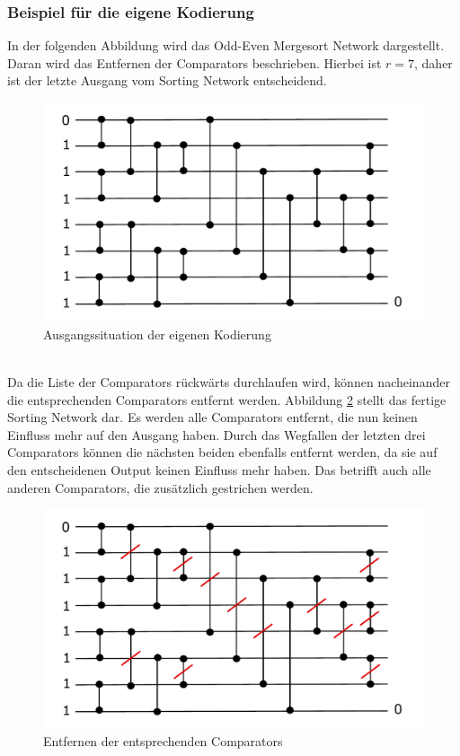 \documentclass[a4,abstract=on]{scrartcl}
\begin{document}
\subsubsection*{Beispiel für die eigene Kodierung}
In der folgenden Abbildung wird das Odd-Even Mergesort Network dargestellt. Daran wird das Entfernen der Comparators beschrieben. Hierbei ist $r=7$, daher ist der letzte Ausgang vom Sorting Network entscheidend.

\begin{figure}[H]
\centering
\includegraphics[width=\textwidth]{own_sorting_start.pdf}
\caption{Ausgangssituation der eigenen Kodierung}
\label{fig:ownSorting}
\end{figure}
\ \\
Da die Liste der Comparators rückwärts durchlaufen wird, können nacheinander die entsprechenden Comparators entfernt werden. Abbildung \ref{fig:ownSorting1} stellt das fertige Sorting Network dar. Es werden alle Comparators entfernt, die nun keinen Einfluss mehr auf den Ausgang haben. Durch das Wegfallen der letzten drei Comparators können die nächsten beiden ebenfalls entfernt werden, da sie auf den entscheidenen Output keinen Einfluss mehr haben. Das betrifft auch alle anderen Comparators, die zusätzlich gestrichen werden. 

\begin{figure}[H]
\centering
\includegraphics[width=\textwidth]{ownSorting_2.pdf}
\caption{Entfernen der entsprechenden Comparators}
\label{fig:ownSorting1}
\end{figure}
\end{document}
